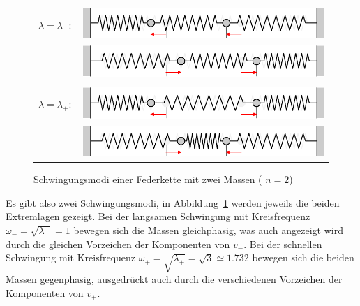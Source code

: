 \begin{figure}
\begin{center}
\begin{tabular}{ll}
$\lambda=\lambda_-:$&%
\includegraphics{images/e-4}\\%
&\includegraphics{images/e-5}\\%
\\
$\lambda=\lambda_+:$&%
\includegraphics{images/e-2}\\%
&\includegraphics{images/e-3}%
\end{tabular}
\end{center}
\caption{Schwingungsmodi einer Federkette mit zwei Massen ( $n=2$)\label{n2modi}}
\end{figure}%
Es gibt also zwei Schwingungsmodi, in
Abbildung~\ref{n2modi} werden jeweils die beiden Extremlagen
gezeigt.
Bei der langsamen Schwingung mit Kreisfrequenz
$\omega_-=\sqrt{\lambda_-}=1$ bewegen sich die Massen gleichphasig,
was auch angezeigt wird durch die gleichen Vorzeichen
der Komponenten von $v_-$.
Bei der schnellen Schwingung mit Kreisfrequenz
$\omega_+=\sqrt{\lambda_+}=\sqrt{3}\simeq 1.732$ bewegen sich die
beiden Massen gegenphasig, ausgedrückt auch durch
die verschiedenen Vorzeichen der Komponenten von $v_+$.

